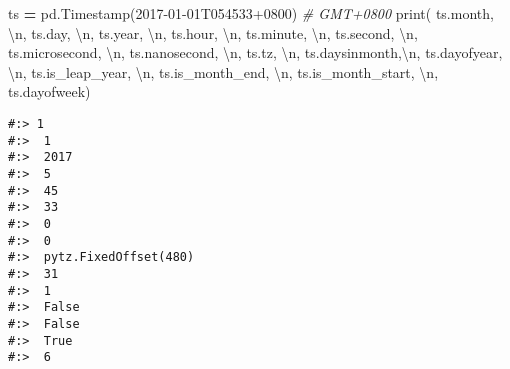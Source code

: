 \documentclass[
]{book}
\newenvironment{Shaded}{\begin{snugshade}}{\end{snugshade}}
\newcommand{\BuiltInTok}[1]{#1}
\newcommand{\CharTok}[1]{\textcolor[rgb]{0.5,0.5,0.5}{#1}}
\newcommand{\CommentTok}[1]{\textcolor[rgb]{0.37,0.37,0.37}{\textit{#1}}}
\newcommand{\NormalTok}[1]{#1}
\newcommand{\OperatorTok}[1]{\textcolor[rgb]{0.43,0.43,0.43}{\textbf{#1}}}
\newcommand{\StringTok}[1]{\textcolor[rgb]{0.5,0.5,0.5}{#1}}
\begin{document}
\begin{Shaded}
\begin{Highlighting}[]
\NormalTok{ts }\OperatorTok{=}\NormalTok{ pd.Timestamp(}\StringTok{\textquotesingle{}2017{-}01{-}01T054533+0800\textquotesingle{}}\NormalTok{) }\CommentTok{\# GMT+0800}
\BuiltInTok{print}\NormalTok{( ts.month, }\StringTok{\textquotesingle{}}\CharTok{\textbackslash{}n}\StringTok{\textquotesingle{}}\NormalTok{,}
\NormalTok{       ts.day, }\StringTok{\textquotesingle{}}\CharTok{\textbackslash{}n}\StringTok{\textquotesingle{}}\NormalTok{,}
\NormalTok{       ts.year, }\StringTok{\textquotesingle{}}\CharTok{\textbackslash{}n}\StringTok{\textquotesingle{}}\NormalTok{,}
\NormalTok{       ts.hour, }\StringTok{\textquotesingle{}}\CharTok{\textbackslash{}n}\StringTok{\textquotesingle{}}\NormalTok{,}
\NormalTok{       ts.minute, }\StringTok{\textquotesingle{}}\CharTok{\textbackslash{}n}\StringTok{\textquotesingle{}}\NormalTok{,}
\NormalTok{       ts.second, }\StringTok{\textquotesingle{}}\CharTok{\textbackslash{}n}\StringTok{\textquotesingle{}}\NormalTok{,}
\NormalTok{       ts.microsecond, }\StringTok{\textquotesingle{}}\CharTok{\textbackslash{}n}\StringTok{\textquotesingle{}}\NormalTok{,}
\NormalTok{       ts.nanosecond, }\StringTok{\textquotesingle{}}\CharTok{\textbackslash{}n}\StringTok{\textquotesingle{}}\NormalTok{,}
\NormalTok{       ts.tz, }\StringTok{\textquotesingle{}}\CharTok{\textbackslash{}n}\StringTok{\textquotesingle{}}\NormalTok{,}
\NormalTok{       ts.daysinmonth,}\StringTok{\textquotesingle{}}\CharTok{\textbackslash{}n}\StringTok{\textquotesingle{}}\NormalTok{,}
\NormalTok{       ts.dayofyear, }\StringTok{\textquotesingle{}}\CharTok{\textbackslash{}n}\StringTok{\textquotesingle{}}\NormalTok{,}
\NormalTok{       ts.is\_leap\_year, }\StringTok{\textquotesingle{}}\CharTok{\textbackslash{}n}\StringTok{\textquotesingle{}}\NormalTok{,}
\NormalTok{       ts.is\_month\_end, }\StringTok{\textquotesingle{}}\CharTok{\textbackslash{}n}\StringTok{\textquotesingle{}}\NormalTok{,}
\NormalTok{       ts.is\_month\_start, }\StringTok{\textquotesingle{}}\CharTok{\textbackslash{}n}\StringTok{\textquotesingle{}}\NormalTok{,}
\NormalTok{       ts.dayofweek)}
\end{Highlighting}
\end{Shaded}

\begin{verbatim}
#:> 1 
#:>  1 
#:>  2017 
#:>  5 
#:>  45 
#:>  33 
#:>  0 
#:>  0 
#:>  pytz.FixedOffset(480) 
#:>  31 
#:>  1 
#:>  False 
#:>  False 
#:>  True 
#:>  6
\end{verbatim}
\end{document}
